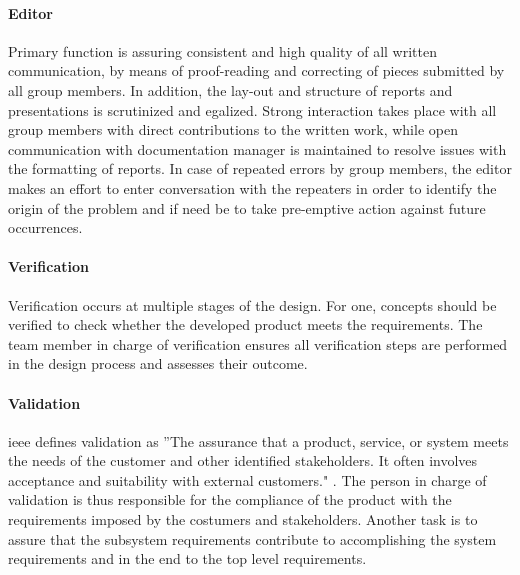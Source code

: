 \paragraph{Editor}
Primary function is assuring consistent and high quality of all written communication, by means of proof-reading and correcting of pieces submitted by all group members. In addition, the lay-out and structure of reports and presentations is scrutinized and egalized. Strong interaction takes place with all group members with direct contributions to the written work, while open communication with documentation manager is maintained to resolve issues with the formatting of reports. In case of repeated errors by group members, the editor makes an effort to enter conversation with the repeaters in order to identify the origin of the problem and if need be to take pre-emptive action against future occurrences.
\paragraph{Verification}
Verification occurs at multiple stages of the design. For one, concepts should be verified to check whether the developed product meets the requirements. The team member in charge of verification ensures all verification steps are performed in the design process and assesses their outcome.

\paragraph{Validation}
\gls{ieee} defines validation as ''The assurance that a product, service, or system meets the needs of the customer and other identified stakeholders. It often involves acceptance and suitability with external customers." \cite[p.452]{IEEE}. The person in charge of validation is thus responsible for the compliance of the product with the requirements imposed by the costumers and stakeholders. Another task is to assure that the subsystem requirements contribute to accomplishing the system requirements and in the end to the top level requirements.
